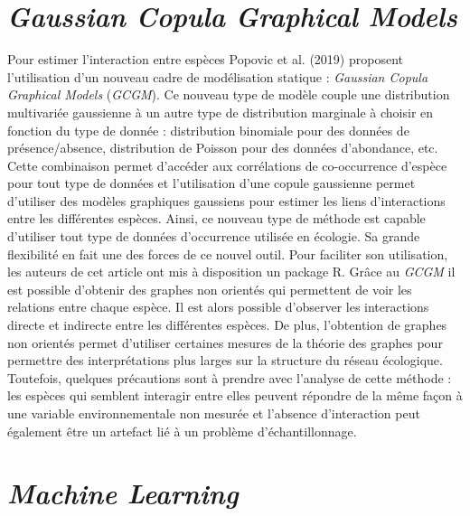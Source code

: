 \documentclass[
  12pt,
  a4paper,
  oneside]{report}
\begin{document}
\hypertarget{gaussian-copula-graphical-models}{%
\section{\texorpdfstring{\emph{Gaussian Copula Graphical
Models}}{Gaussian Copula Graphical Models}}\label{gaussian-copula-graphical-models}}

Pour estimer l'interaction entre espèces Popovic et al. (2019) proposent
l'utilisation d'un nouveau cadre de modélisation statique :
\emph{Gaussian Copula Graphical Models} (\emph{GCGM}). Ce nouveau type
de modèle couple une distribution multivariée gaussienne à un autre type
de distribution marginale à choisir en fonction du type de donnée :
distribution binomiale pour des données de présence/absence,
distribution de Poisson pour des données d'abondance, etc. Cette
combinaison permet d'accéder aux corrélations de co-occurrence d'espèce
pour tout type de données et l'utilisation d'une copule gaussienne
permet d'utiliser des modèles graphiques gaussiens pour estimer les
liens d'interactions entre les différentes espèces. Ainsi, ce nouveau
type de méthode est capable d'utiliser tout type de données d'occurrence
utilisée en écologie. Sa grande flexibilité en fait une des forces de ce
nouvel outil. Pour faciliter son utilisation, les auteurs de cet article
ont mis à disposition un package R. Grâce au \emph{GCGM} il est possible
d'obtenir des graphes non orientés qui permettent de voir les relations
entre chaque espèce. Il est alors possible d'observer les interactions
directe et indirecte entre les différentes espèces. De plus, l'obtention
de graphes non orientés permet d'utiliser certaines mesures de la
théorie des graphes pour permettre des interprétations plus larges sur
la structure du réseau écologique. Toutefois, quelques précautions sont
à prendre avec l'analyse de cette méthode : les espèces qui semblent
interagir entre elles peuvent répondre de la même façon à une variable
environnementale non mesurée et l'absence d'interaction peut également
être un artefact lié à un problème d'échantillonnage.

\hypertarget{machine-learning}{%
\section{\texorpdfstring{\emph{Machine
Learning}}{Machine Learning}}\label{machine-learning}}
\end{document}
